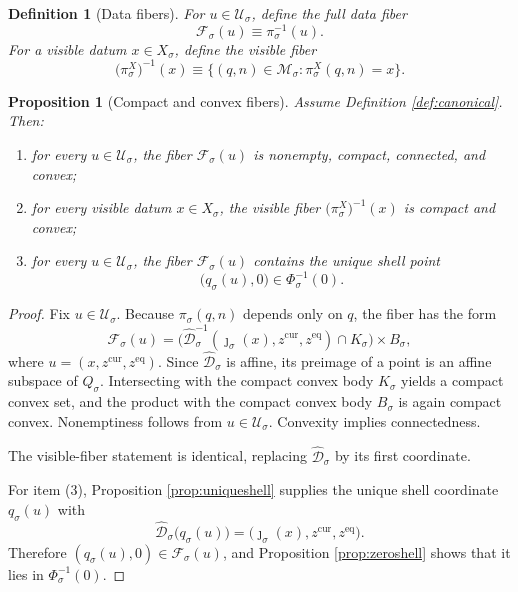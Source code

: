 \documentclass[11pt]{article}
\newcommand{\SubSpace}[1]{\mathcal M_{#1}}
\newcommand{\DataProj}[1]{\pi_{#1}}
\newcommand{\SubVisible}[1]{\pi_{#1}^{X}}
\newcommand{\ShellEquation}[1]{\Phi_{#1}}
\newcommand{\Fiber}[1]{\mathcal F_{#1}}
\newcommand{\DeepSpace}[1]{\mathcal U_{#1}}
\newcommand{\CoordSpace}[1]{Q_{#1}}
\newcommand{\CoordBody}[1]{K_{#1}}
\newcommand{\NormalBody}[1]{B_{#1}}
\newcommand{\AffineData}[1]{\widehat{\mathcal D}_{#1}}
\newtheorem{definition}{Definition}
\newtheorem{proposition}{Proposition}
\begin{document}
\begin{definition}[Data fibers]
\label{def:fibers}
For \(u\in\DeepSpace{\sigma}\), define the full data fiber
\[
\Fiber{\sigma}(u)\equiv\DataProj{\sigma}^{-1}(u).
\]
For a visible datum \(x\in X_{\sigma}\), define the visible fiber
\[
\bigl(\SubVisible{\sigma}\bigr)^{-1}(x)
\equiv
\{(q,n)\in\SubSpace{\sigma}:\SubVisible{\sigma}(q,n)=x\}.
\]
\end{definition}

\begin{proposition}[Compact and convex fibers]
\label{prop:fibers}
Assume Definition \ref{def:canonical}. Then:
\begin{enumerate}
    \item for every \(u\in\DeepSpace{\sigma}\), the fiber \(\Fiber{\sigma}(u)\) is nonempty, compact, connected, and convex;
    \item for every visible datum \(x\in X_{\sigma}\), the visible fiber \(\bigl(\SubVisible{\sigma}\bigr)^{-1}(x)\) is compact and convex;
    \item for every \(u\in\DeepSpace{\sigma}\), the fiber \(\Fiber{\sigma}(u)\) contains the unique shell point
    \[
    \bigl(q_{\sigma}(u),0\bigr)
    \in
    \ShellEquation{\sigma}^{-1}(0).
    \]
\end{enumerate}
\end{proposition}

\begin{proof}
Fix \(u\in\DeepSpace{\sigma}\). Because \(\DataProj{\sigma}(q,n)\) depends only on \(q\), the fiber has the form
\[
\Fiber{\sigma}(u)
=
\bigl(
\AffineData{\sigma}^{-1}(\jmath_{\sigma}(x),z^{\mathrm{cur}},z^{\mathrm{eq}})
\cap
\CoordBody{\sigma}
\bigr)
\times
\NormalBody{\sigma},
\]
where \(u=(x,z^{\mathrm{cur}},z^{\mathrm{eq}})\). Since \(\AffineData{\sigma}\) is affine, its preimage of a point is an affine subspace of \(\CoordSpace{\sigma}\). Intersecting with the compact convex body \(\CoordBody{\sigma}\) yields a compact convex set, and the product with the compact convex body \(\NormalBody{\sigma}\) is again compact convex. Nonemptiness follows from \(u\in\DeepSpace{\sigma}\). Convexity implies connectedness.

The visible-fiber statement is identical, replacing \(\AffineData{\sigma}\) by its first coordinate.

For item (3), Proposition \ref{prop:uniqueshell} supplies the unique shell coordinate \(q_{\sigma}(u)\) with
\[
\AffineData{\sigma}\bigl(q_{\sigma}(u)\bigr)
=
\bigl(
\jmath_{\sigma}(x),z^{\mathrm{cur}},z^{\mathrm{eq}}
\bigr).
\]
Therefore \((q_{\sigma}(u),0)\in\Fiber{\sigma}(u)\), and Proposition \ref{prop:zeroshell} shows that it lies in \(\ShellEquation{\sigma}^{-1}(0)\).
\end{proof}
\end{document}
